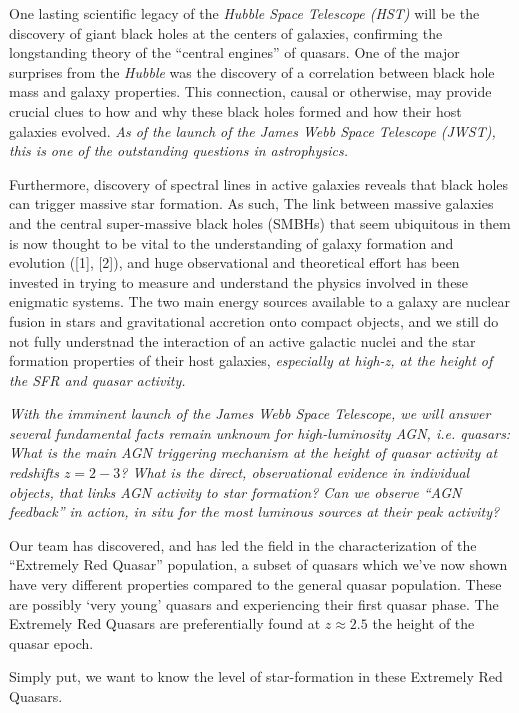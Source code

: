 

One lasting scientific legacy of the {\it Hubble Space Telescope
(HST)} will be the discovery of giant black holes at the centers of
galaxies, confirming the longstanding theory of the ``central
engines'' of quasars. One of the major surprises from the {\it Hubble}
was the discovery of a correlation between black hole mass and galaxy
properties.  This connection, causal or otherwise, may provide crucial
clues to how and why these black holes formed and how their host
galaxies evolved. {\it As of the launch of the James Webb Space
Telescope (JWST), this is one of the outstanding questions in
astrophysics.}

Furthermore, discovery of spectral lines in active galaxies reveals that black holes can trigger massive star formation. 
As such, %
The link between massive galaxies and the central super-massive black holes (SMBHs) that seem ubiquitous in them is now thought to be vital to the understanding of galaxy formation and evolution ([1], [2]), and huge observational and theoretical effort has been invested in trying to measure and understand the physics involved in these enigmatic systems.
The two main energy sources available to a galaxy are nuclear fusion in stars and gravitational accretion onto compact objects, and we still do not fully understnad the interaction of an active galactic nuclei and the star formation properties of their host galaxies, {\it especially at high-z, at the height of the SFR and quasar activity.} 

{\it With the imminent launch of the {\it James Webb Space Telescope}, we will answer several fundamental facts remain unknown for high-luminosity AGN, i.e. quasars: What is the main AGN triggering mechanism at the height of quasar activity at redshifts $z=2-3$? What is the direct, observational evidence in individual objects, that links AGN activity to star formation? Can we observe ``AGN feedback'' in action, in situ for the most luminous sources at their peak activity? 

Our team has discovered, and has led the field in the characterization of the ``Extremely Red Quasar'' population, a subset of quasars which we've now shown have very different properties compared to the general quasar population. These are possibly `very young' quasars and experiencing their first quasar phase. 
The Extremely Red Quasars are preferentially found at $z \approx 2.5$ the height of the quasar epoch. 

Simply put, we want to know the level of star-formation in these Extremely Red Quasars. 
} 


